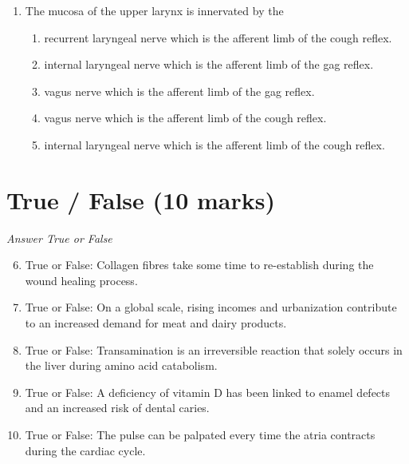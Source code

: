 \documentclass[12pt]{article}
\begin{document}
\begin{enumerate}[label=\arabic*.]
\begin{enumerate}[label=(\alph*)]
    \item Type IIX fibres.
    \item Type III fibres.
    \item Type VII fibres.
    \item Type V fibres.
    \item Type Ia fibres.
\end{enumerate}
\item The mucosa of the upper larynx is innervated by the
\begin{enumerate}[label=(\alph*)]
    \item recurrent laryngeal nerve which is the afferent limb of the cough reflex.
    \item internal laryngeal nerve which is the afferent limb of the gag reflex.
    \item vagus nerve which is the afferent limb of the gag reflex.
    \item vagus nerve which is the afferent limb of the cough reflex.
    \item internal laryngeal nerve which is the afferent limb of the cough reflex.
\end{enumerate}
\end{enumerate}

\section*{True / False (10 marks)}
\textit{Answer True or False}
\begin{enumerate}[label=\arabic*.]
\setcounter{enumi}{5}
\item True or False: Collagen fibres take some time to re-establish during the wound healing process.
\item True or False: On a global scale, rising incomes and urbanization contribute to an increased demand for meat and dairy products.
\item True or False: Transamination is an irreversible reaction that solely occurs in the liver during amino acid catabolism.
\item True or False: A deficiency of vitamin D has been linked to enamel defects and an increased risk of dental caries.
\item True or False: The pulse can be palpated every time the atria contracts during the cardiac cycle.
\end{enumerate}
\end{document}
